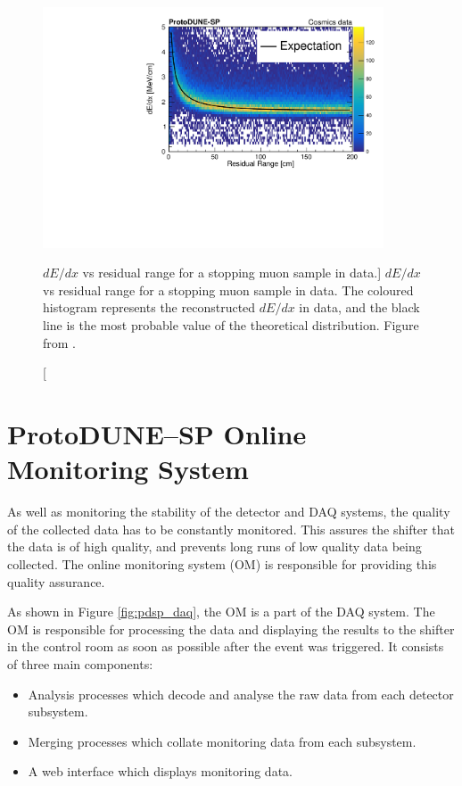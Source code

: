 \begin{figure}

	\centering

	\includegraphics[width=0.9\textwidth]{figures/dedx_v_rr.pdf}

	\caption
	[$dE/dx$ vs residual range for a stopping muon sample in \protodune{} data.]
	{$dE/dx$ vs residual range for a stopping muon sample in \protodune{} data.
	The coloured histogram represents the reconstructed $dE/dx$ in \protodune{}
	data, and the black line is the most probable value of the theoretical 
	distribution. Figure from \cite{protoduneperf}.}

	\label{fig:dedx_v_rr}

\end{figure}

\section{ProtoDUNE--SP Online Monitoring System} \label{sec:pdsp_om}

As well as monitoring the stability of the detector and DAQ systems, the quality
of the collected data has to be constantly monitored. This assures the shifter 
that the data is of high quality, and prevents long runs of low quality data
being collected. The online monitoring system (OM) is responsible for 
providing this quality assurance.

As shown in Figure \ref{fig:pdsp_daq}, the OM is a part of the \protodune{} DAQ
system. The OM is responsible for processing the data and displaying
the results to the shifter in the control room as soon as possible after the
event was triggered. It consists of three main components:
\begin{itemize}
	\item Analysis processes which decode and analyse the raw data from each 
		detector subsystem.
	\item Merging processes which collate monitoring data from each subsystem.
	\item A web interface which displays monitoring data.
\end{itemize}

